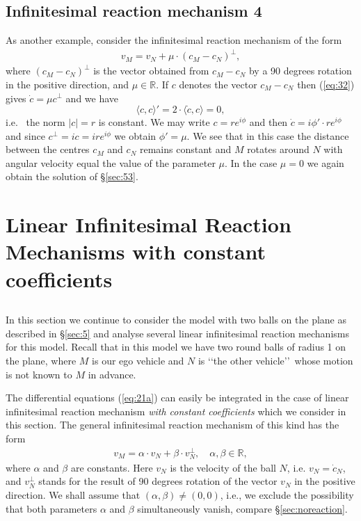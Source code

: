 \documentclass[11pt]{amsart}
\def\R{\mathbb R}
\begin{document}
{\subsection{Infinitesimal reaction mechanism 4} \label{sec:55}
As another example, consider the infinitesimal reaction mechanism of the form
\begin{eqnarray}\label{eq:32}
v_M=v_N+\mu \cdot(c_M-c_N)^{\perp},
\end{eqnarray}
where $(c_M-c_N)^{\perp}$ is the vector obtained from $c_M-c_N$ by a 90 degrees rotation in the positive direction, and $\mu\in \R$. 
If $c$ denotes the vector $c_M-c_N$ then (\ref{eq:32}) gives $\dot c=\mu c^\perp$ and we have 
$$
\langle c, c\rangle' = 2 \cdot \langle \dot c, c\rangle =0,
$$
i.e. ~the norm $|c|=r$ is constant. We may write $c=r e^{i\phi}$ and then $\dot c=i\phi'\cdot re^{i\phi}$ and since $c^\perp=ic= ire^{i\phi}$ we obtain
$
\phi'=\mu.
$
We see that in this case the distance between the centres $c_M$ and $c_N$ remains constant and $M$ rotates around $N$ with angular velocity 
equal the value of 
the parameter $\mu$. In the case $\mu=0$ we again obtain the solution of \S \ref{sec:53}.

\section{Linear Infinitesimal Reaction Mechanisms with constant coefficients} \label{sec:6}

\subsection{} In this section we continue to consider the model with two balls on the plane as described in \S \ref{sec:5} and analyse several linear infinitesimal reaction mechanisms for this model. 
Recall that in this model we have two round balls of radius 1 on the plane, where $M$ is our ego vehicle and $N$ is \lq\lq the other vehicle\rq\rq\ whose motion is not known to $M$ in advance. 

The differential equations (\ref{eq:21a}) can easily be integrated in the case of linear infinitesimal reaction mechanism {\it with constant coefficients} which we consider in this section. 
The general infinitesimal reaction mechanism of this kind has the form 
\begin{eqnarray}\label{eq:irm1}
v_M=\alpha\cdot v_N + \beta\cdot v_N^{\perp},\quad \alpha, \beta\in \R,
\end{eqnarray}
where $\alpha$ and $\beta$ are constants.  Here $v_N$ is the velocity of the ball $N$, i.e. $v_N=\dot c_N$, and $v_N^\perp$ stands for the result of 90 degrees rotation of the vector $v_N$ in the positive direction. We shall assume that  $(\alpha, \beta)\not=(0,0)$, i.e., we exclude the possibility that both parameters $\alpha$ and $\beta$ simultaneously vanish, compare \S \ref{sec:noreaction}. 

}
\end{document}
